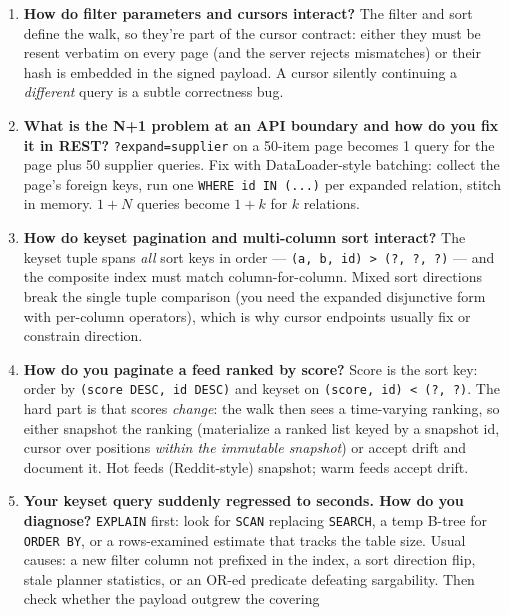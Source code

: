 \begin{enumerate}[label=\textbf{Q\arabic*.}, leftmargin=2.6em]
        protects the keyword position, which bind parameters cannot reach.
  \item \textbf{How do filter parameters and cursors interact?}
        The filter and sort define the walk, so they're part of the cursor
        contract: either they must be resent verbatim on every page (and
        the server rejects mismatches) or their hash is embedded in the
        signed payload. A cursor silently continuing a \emph{different}
        query is a subtle correctness bug.
  \item \textbf{What is the N+1 problem at an API boundary and how do you
        fix it in REST?}
        \texttt{?expand=supplier} on a 50-item page becomes 1 query for the
        page plus 50 supplier queries. Fix with DataLoader-style batching:
        collect the page's foreign keys, run one \texttt{WHERE id IN (...)}
        per expanded relation, stitch in memory. $1{+}N$ queries become
        $1{+}k$ for $k$ relations.
  \item \textbf{How do keyset pagination and multi-column sort interact?}
        The keyset tuple spans \emph{all} sort keys in order ---
        \texttt{(a, b, id) > (?, ?, ?)} --- and the composite index must
        match column-for-column. Mixed sort directions break the single
        tuple comparison (you need the expanded disjunctive form with
        per-column operators), which is why cursor endpoints usually fix or
        constrain direction.
  \item \textbf{How do you paginate a feed ranked by score?}
        Score is the sort key: order by \texttt{(score DESC, id DESC)} and
        keyset on \texttt{(score, id) < (?, ?)}. The hard part is that
        scores \emph{change}: the walk then sees a time-varying ranking, so
        either snapshot the ranking (materialize a ranked list keyed by a
        snapshot id, cursor over positions \emph{within the immutable
        snapshot}) or accept drift and document it. Hot feeds (Reddit-style)
        snapshot; warm feeds accept drift.
  \item \textbf{Your keyset query suddenly regressed to seconds. How do you
        diagnose?}
        \texttt{EXPLAIN} first: look for \texttt{SCAN} replacing
        \texttt{SEARCH}, a temp B-tree for \texttt{ORDER BY}, or a
        rows-examined estimate that tracks the table size. Usual causes: a
        new filter column not prefixed in the index, a sort direction flip,
        stale planner statistics, or an OR-ed predicate defeating
        sargability. Then check whether the payload outgrew the covering

\end{enumerate}
